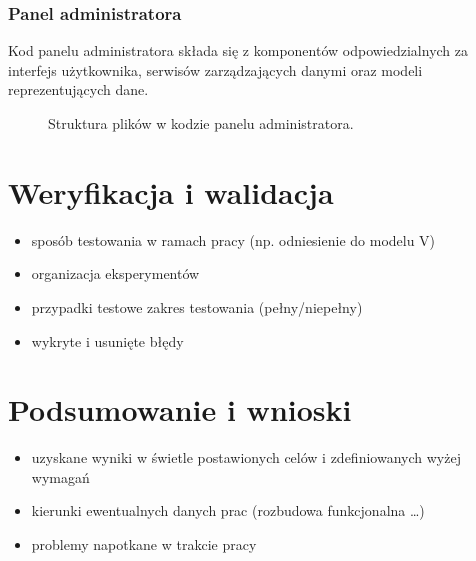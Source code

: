 \documentclass[a4paper,twoside,12pt]{book}
\begin{document}
\subsection{Panel administratora}

Kod panelu administratora składa się z komponentów odpowiedzialnych za interfejs użytkownika, serwisów zarządzających danymi oraz modeli reprezentujących dane.

\begin{figure}
\caption{Struktura plików w kodzie panelu administratora.}
\label{fig:dirtree}
\end{figure}


\chapter{Weryfikacja i walidacja}
\label{ch:06}
\begin{itemize}
\item sposób testowania w ramach pracy (np. odniesienie do modelu V)
\item organizacja eksperymentów
\item przypadki testowe zakres testowania (pełny/niepełny)
\item wykryte i usunięte błędy
\end{itemize}

\chapter{Podsumowanie i wnioski}
\begin{itemize}
\item uzyskane wyniki w świetle postawionych celów i zdefiniowanych wyżej wymagań
\item kierunki ewentualnych danych prac (rozbudowa funkcjonalna …)
\item problemy napotkane w trakcie pracy
\end{itemize}

\backmatter

\printbibliography           %
\end{document}
